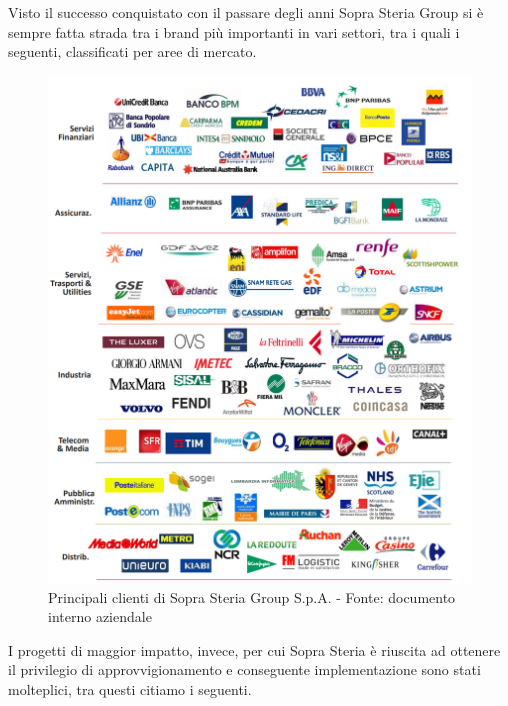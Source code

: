 	
	Visto il successo conquistato con il passare degli anni Sopra Steria Group si è sempre fatta strada tra i brand più importanti in vari settori, tra i quali i seguenti, classificati per aree di mercato.
	\begin{figure}[H]
	\centering
   	\includegraphics[width=1\textwidth]{immagini/principali_referenze}
   	\caption{Principali clienti di Sopra Steria Group S.p.A. - Fonte: documento interno aziendale}
	\end{figure}
\newpage
	I progetti di maggior impatto, invece, per cui Sopra Steria è riuscita ad ottenere il privilegio di approvvigionamento e conseguente implementazione sono stati molteplici, tra questi citiamo i seguenti.
